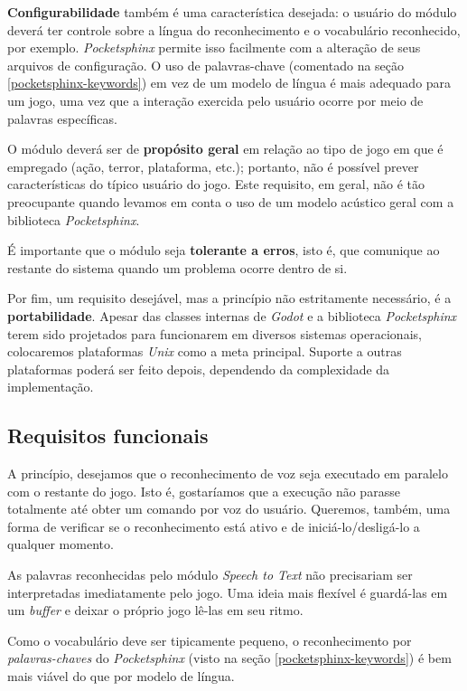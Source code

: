 \textbf{Configurabilidade} também é uma característica desejada: o usuário do módulo deverá ter controle sobre a língua do reconhecimento e o vocabulário reconhecido, por exemplo. \textit{Pocketsphinx} permite isso facilmente com a alteração de seus arquivos de configuração. O uso de palavras-chave (comentado na seção \ref{pocketsphinx-keywords}) em vez de um modelo de língua é mais adequado para um jogo, uma vez que a interação exercida pelo usuário ocorre por meio de palavras específicas.

O módulo deverá ser de \textbf{propósito geral} em relação ao tipo de jogo em que é empregado (ação, terror, plataforma, etc.); portanto, não é possível prever características do típico usuário do jogo. Este requisito, em geral, não é tão preocupante quando levamos em conta o uso de um modelo acústico geral com a biblioteca \textit{Pocketsphinx}.

É importante que o módulo seja \textbf{tolerante a erros}, isto é, que comunique ao restante do sistema quando um problema ocorre dentro de si.

Por fim, um requisito desejável, mas a princípio não estritamente necessário, é a  \textbf{portabilidade}. Apesar das classes internas de \textit{Godot} e a biblioteca \textit{Pocketsphinx} terem sido projetados para funcionarem em diversos sistemas operacionais, colocaremos plataformas \textit{Unix} como a meta principal. Suporte a outras plataformas poderá ser feito depois, dependendo da complexidade da implementação.


\subsection{Requisitos funcionais}
\label{moduleFunctionalRequirements}

A princípio, desejamos que o reconhecimento de voz seja executado em paralelo com o restante do jogo. Isto é, gostaríamos que a execução não parasse totalmente até obter um comando por voz do usuário. Queremos, também, uma forma de verificar se o reconhecimento está ativo e de iniciá-lo/desligá-lo a qualquer momento.

As palavras reconhecidas pelo módulo \textit{Speech to Text} não precisariam ser interpretadas imediatamente pelo jogo. Uma ideia mais flexível é guardá-las em um \textit{buffer} e deixar o próprio jogo lê-las em seu ritmo.

Como o vocabulário deve ser tipicamente pequeno, o reconhecimento por \emph{palavras-chaves} do \textit{Pocketsphinx} (visto na seção \ref{pocketsphinx-keywords}) é bem mais viável do que por modelo de língua.

